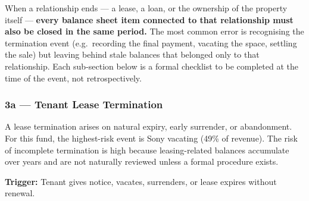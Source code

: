\documentclass[10pt,a4paper]{article}
\begin{document}
\begin{critical}
When a relationship ends --- a lease, a loan, or the ownership of the property itself --- \textbf{every balance sheet item connected to that relationship must also be closed in the same period.} The most common error is recognising the termination event (e.g.\ recording the final payment, vacating the space, settling the sale) but leaving behind stale balances that belonged only to that relationship. Each sub-section below is a formal checklist to be completed at the time of the event, not retrospectively.
\end{critical}

\subsubsection{3a --- Tenant Lease Termination}
\label{sec:grp3a}

A lease termination arises on natural expiry, early surrender, or abandonment. For this fund, the highest-risk event is Sony vacating (49\% of revenue). The risk of incomplete termination is high because leasing-related balances accumulate over years and are not naturally reviewed unless a formal procedure exists.

\textbf{Trigger:} Tenant gives notice, vacates, surrenders, or lease expires without renewal.
\end{document}
